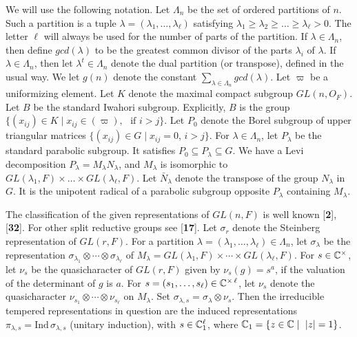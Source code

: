 \documentclass{amsart}
\begin{document}
We will use the following notation.  
Let $\Lambda_n$ be
  the set of ordered partitions of $n$.  Such a partition is a tuple
  $ \lambda = (\lambda_1, \dots , \lambda_{\ell})$ satisfying
    $\lambda_1 \geq \lambda_2 \geq \dots \geq\lambda_{\ell} > 0 $.
    The letter $\ell$ will always be used for the number of
    parts of the partition.
  If 
  $ \lambda \in \Lambda_n$, then define  $gcd (\lambda)$ to be the
  greatest common divisor of the parts
  $ \lambda_i$ of $\lambda$.
  If $\lambda\in \Lambda_n$, then let $\lambda^t\in\Lambda_n$ 
  denote the dual partition (or transpose), defined in the usual way.
We let $g(n)$ denote the constant
  $ \sum\limits_{\lambda \in \Lambda_n}
  gcd (\lambda) $.
%
Let 
$\varpi$ be
  a uniformizing element.  Let $K$ denote the maximal
  compact subgroup $GL(n,O_F)$.  Let
$B$ be the standard Iwahori subgroup.  Explicitly, $B$ is the group
  $ \{
      (x_{ij}) \in K \mid
       x_{ij} \in (\varpi), \,\,
    \text{ if }  i > j
    \} $.
Let $P_0$ denote the 
    Borel subgroup of upper triangular matrices
      $ \{ (x_{ij}) \in G \mid x_{ij} = 0 $,
      $ i > j \} $.
%
For $\lambda\in \Lambda_n$, let $P_\lambda$ be the
    standard parabolic subgroup.  It satisfies
      $ P_0 \subseteq P_{\lambda} \subseteq G $.
%
We have a Levi decomposition
$P_{\lambda}=M_{\lambda}N_{\lambda}$,
and
      $ M_{\lambda} $
    is isomorphic to 
      $ GL(\lambda_1, F)\times \dots \times 
        GL(\lambda_{\ell}, F) $.
%
Let $\bar N_\lambda$ denote the transpose of the group
$N_\lambda$ in $G$.  It is the unipotent radical of a
parabolic subgroup opposite $P_\lambda$ containing $M_\lambda$.



The classification of the given representations of $ GL (n,F) $
is well known [{\bf 2}], [{\bf 32}].  For other split reductive
groups see [{\bf 17}].  Let $\sigma_r$ denote the Steinberg
representation of $GL(r,F)$.  For a partition 
$\lambda=(\lambda_1,\ldots,\lambda_\ell)\in\Lambda_n$, let
$\sigma_\lambda$ be the representation $\sigma_{\lambda_1}\otimes
\cdots\otimes\sigma_{\lambda_\ell}$ of $M_\lambda  = 
GL(\lambda_1,F)\times \cdots\times GL(\lambda_\ell,F)$.  For
$s\in {\Bbb C}^\times$, let $\nu_s$ be the quasicharacter of
$GL(r,F)$ given by $\nu_s(g) = s^a$, if the valuation of the determinant
of $g$ is $a$.  For $s=(s_1,\ldots,s_\ell)\in {\Bbb C}^{\times\,\ell}$, let
$\nu_s$ denote the quasicharacter $\nu_{s_1}\otimes\cdots\otimes
\nu_{s_\ell}$ on $M_\lambda$.  Set $\sigma_{\lambda,s}=\sigma_\lambda
\otimes \nu_s$.  Then the irreducible tempered representations 
in question are the induced representations 
$\pi_{\lambda,s} = \text{Ind}\,\sigma_{\lambda,s}$ (unitary
induction), with $s\in {\Bbb C}_1^\ell$, where ${\Bbb C_1}= \{z\in {\Bbb C}\mid
\ |z|=1\}$.
\end{document}
